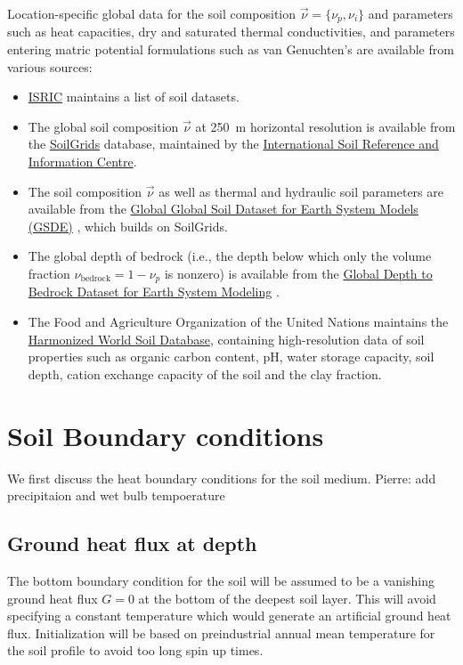 \documentclass{report}
\begin{document}
Location-specific global data for the soil composition $\vec{\nu} = \{\nu_p, \nu_i\}$ and parameters such as heat capacities, dry and saturated thermal conductivities, and parameters entering matric potential formulations such as van Genuchten's are available from various sources:
\begin{itemize}
    \item \href{https://www.isric.org/explore/soil-geographic-databases}{ISRIC} maintains a list of soil datasets. 
    \item The global soil composition $\vec{\nu}$ at 250~m horizontal resolution is available from the \href{https://www.isric.org/explore/soilgrids/}{SoilGrids} database, maintained by the \href{https://www.isric.org}{International Soil Reference and Information Centre}.
    \item The soil composition $\vec{\nu}$ as well as thermal and hydraulic soil parameters are available from the \href{http://globalchange.bnu.edu.cn/research/soil5.jsp}{Global Global Soil Dataset for Earth System Models (GSDE)} \citep{Dai19a,Dai19b}, which builds on SoilGrids.
    \item The global depth of bedrock (i.e., the depth below which only the volume fraction $\nu_{\mathrm{bedrock}} = 1-\nu_p$ is nonzero) is available from the \href{http://globalchange.bnu.edu.cn/research/dtb.jsp}{Global Depth to Bedrock Dataset for Earth System Modeling} \citep{Shanggua17a}.
    \item The Food and Agriculture Organization of the United Nations maintains the \href{http://www.fao.org/soils-portal/soil-survey/soil-maps-and-databases/harmonized-world-soil-database-v12/en/}{Harmonized World Soil Database}, containing high-resolution data of soil properties such as organic carbon content, pH, water storage capacity, soil depth, cation exchange capacity of the soil and the clay fraction.
\end{itemize}

\section{Soil Boundary conditions}
We first discuss the heat boundary conditions for the soil medium.
Pierre: add precipitaion and wet bulb tempoerature

\subsection{Ground heat flux at depth}
The bottom boundary condition for the soil will be assumed to be a vanishing ground heat flux $G=0$ at the bottom of the deepest soil layer. This will avoid specifying a constant temperature which would generate an artificial ground heat flux. Initialization will be based on preindustrial annual mean temperature for the soil profile to avoid too long spin up times.
\end{document}
